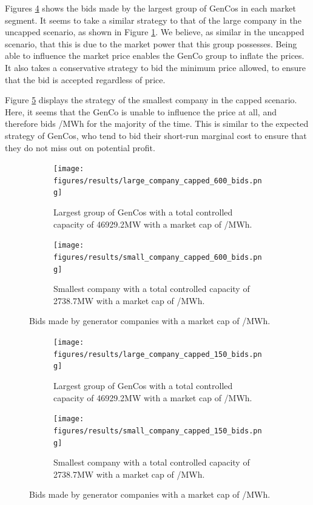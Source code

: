 \documentclass[conference]{IEEEtran}
\begin{document}
Figures \ref{fig:large_company_capped_150_bids} shows the bids made by the largest group of GenCos in each market segment. It seems to take a similar strategy to that of the large company in the uncapped scenario, as shown in Figure \ref{fig:large_company_capped_600_bids}. We believe, as similar in the uncapped scenario, that this is due to the market power that this group possesses. Being able to influence the market price enables the GenCo group to inflate the prices. It also takes a conservative strategy to bid the minimum price allowed, to ensure that the bid is accepted regardless of price.

Figure \ref{fig:small_company_capped_150_bids} displays the strategy of the smallest company in the capped scenario. Here, it seems that the GenCo is unable to influence the price at all, and therefore bids /MWh for the majority of the time. This is similar to the expected strategy of GenCos, who tend to bid their short-run marginal cost to ensure that they do not miss out on potential profit.


\begin{figure}
\centering
\begin{subfigure}[b]{0.49\textwidth}   
\texttt{[image: figures/results/large\_company\_capped\_600\_bids.png]}
\caption{Largest group of GenCos with a total controlled capacity of 46929.2MW with a market cap of /MWh.}
\label{fig:large_company_capped_600_bids}
\end{subfigure}
\hfil
\begin{subfigure}[b]{0.49\textwidth}   
\texttt{[image: figures/results/small\_company\_capped\_600\_bids.png]}
\caption{Smallest company with a total controlled capacity of 2738.7MW with a market cap of /MWh.}
\label{fig:small_company_capped_600_bids}
\end{subfigure}
\caption{Bids made by generator companies with a market cap of /MWh.}
\label{fig:capped_600_bids}
\end{figure}




\begin{figure}
\centering
\begin{subfigure}[b]{0.49\textwidth}   
\texttt{[image: figures/results/large\_company\_capped\_150\_bids.png]}
\caption{Largest group of GenCos with a total controlled capacity of 46929.2MW with a market cap of /MWh.}
\label{fig:large_company_capped_150_bids}
\end{subfigure}
\hfil
\begin{subfigure}[b]{0.49\textwidth}   
\texttt{[image: figures/results/small\_company\_capped\_150\_bids.png]}
\caption{Smallest company with a total controlled capacity of 2738.7MW with a market cap of /MWh.}
\label{fig:small_company_capped_150_bids}
\end{subfigure}
\caption{Bids made by generator companies with a market cap of /MWh.}
\label{fig:capped_150_bids}
\end{figure}
\end{document}

